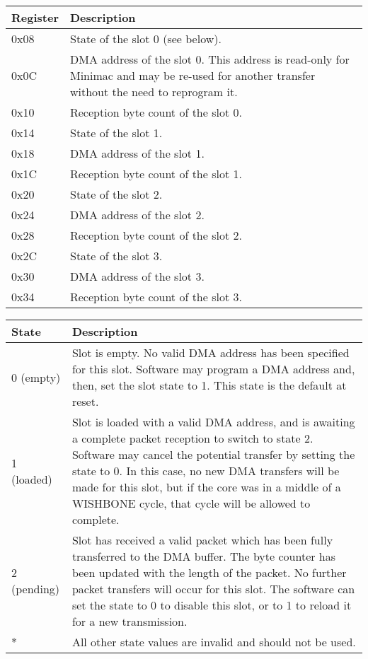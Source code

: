 \documentclass[a4paper,11pt]{article}
\begin{document}
\begin{tabularx}{450pt}{|l|X|}
\hline
\textbf{Register} & \textbf{Description} \\
\hline
0x08 & State of the slot 0 (see below). \\
\hline
0x0C & DMA address of the slot 0. This address is read-only for Minimac and may be re-used for another transfer without the need to reprogram it. \\
\hline
0x10 & Reception byte count of the slot 0. \\
\hline
0x14 & State of the slot 1. \\
\hline
0x18 & DMA address of the slot 1. \\
\hline
0x1C & Reception byte count of the slot 1. \\
\hline
0x20 & State of the slot 2. \\
\hline
0x24 & DMA address of the slot 2. \\
\hline
0x28 & Reception byte count of the slot 2. \\
\hline
0x2C & State of the slot 3. \\
\hline
0x30 & DMA address of the slot 3. \\
\hline
0x34 & Reception byte count of the slot 3. \\
\hline
\end{tabularx}

\begin{tabularx}{450pt}{|l|X|}
\hline
\textbf{State} & \textbf{Description} \\
\hline
0 (empty) & Slot is empty. No valid DMA address has been specified for this slot. Software may program a DMA address and, then, set the slot state to 1. This state is the default at reset. \\
\hline
1 (loaded) & Slot is loaded with a valid DMA address, and is awaiting a complete packet reception to switch to state 2. Software may cancel the potential transfer by setting the state to 0. In this case, no new DMA transfers will be made for this slot, but if the core was in a middle of a WISHBONE cycle, that cycle will be allowed to complete. \\
\hline
2 (pending) & Slot has received a valid packet which has been fully transferred to the DMA buffer. The byte counter has been updated with the length of the packet. No further packet transfers will occur for this slot. The software can set the state to 0 to disable this slot, or to 1 to reload it for a new transmission. \\
\hline
* & All other state values are invalid and should not be used. \\
\hline
\end{tabularx}
\end{document}
